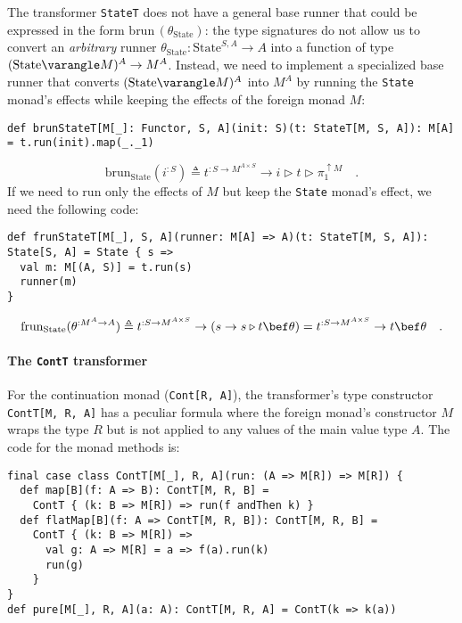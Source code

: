 The transformer \lstinline!StateT! does not have a general base runner
that could be expressed in the form $\text{brun}\,(\theta_{\text{State}})$:
the type signatures do not allow us to convert an \emph{arbitrary}
runner $\theta_{\text{State}}:\text{State}^{S,A}\rightarrow A$ into
a function of type $(\text{State}\varangle M)^{A}\rightarrow M^{A}$.
Instead, we need to implement a specialized base runner that converts
$(\text{State}\varangle M)^{A}$ into $M^{A}$ by running the \lstinline!State!
monad\textsf{'}s effects while keeping the effects of the foreign monad $M$:
\begin{lstlisting}
def brunStateT[M[_]: Functor, S, A](init: S)(t: StateT[M, S, A]): M[A] = t.run(init).map(_._1)
\end{lstlisting}
\[
\text{brun}_{\text{State}}(i^{:S})\triangleq t^{:S\rightarrow M^{A\times S}}\rightarrow i\triangleright t\triangleright\pi_{1}^{\uparrow M}\quad.
\]
If we need to run only the effects of $M$ but keep the \lstinline!State!
monad\textsf{'}s effect, we need the following code:
\begin{lstlisting}
def frunStateT[M[_], S, A](runner: M[A] => A)(t: StateT[M, S, A]): State[S, A] = State { s =>
  val m: M[(A, S)] = t.run(s)
  runner(m)
}
\end{lstlisting}
\[
\text{frun}_{\text{State}}(\theta^{:M^{A}\rightarrow A})\triangleq t^{:S\rightarrow M^{A\times S}}\rightarrow\left(s\rightarrow s\triangleright t\bef\theta\right)=t^{:S\rightarrow M^{A\times S}}\rightarrow t\bef\theta\quad.
\]


\paragraph{The \texttt{ContT} transformer}

For the continuation monad (\lstinline!Cont[R, A]!), the transformer\textsf{'}s
type constructor \lstinline!ContT[M, R, A]! has a peculiar formula
where the foreign monad\textsf{'}s constructor $M$ wraps the type $R$ but
is not applied to any values of the main value type $A$. The code
for the monad methods is:
\begin{lstlisting}
final case class ContT[M[_], R, A](run: (A => M[R]) => M[R]) {
  def map[B](f: A => B): ContT[M, R, B] =
    ContT { (k: B => M[R]) => run(f andThen k) }
  def flatMap[B](f: A => ContT[M, R, B]): ContT[M, R, B] =
    ContT { (k: B => M[R]) =>
      val g: A => M[R] = a => f(a).run(k)
      run(g) 
    }
}
def pure[M[_], R, A](a: A): ContT[M, R, A] = ContT(k => k(a))
\end{lstlisting}

